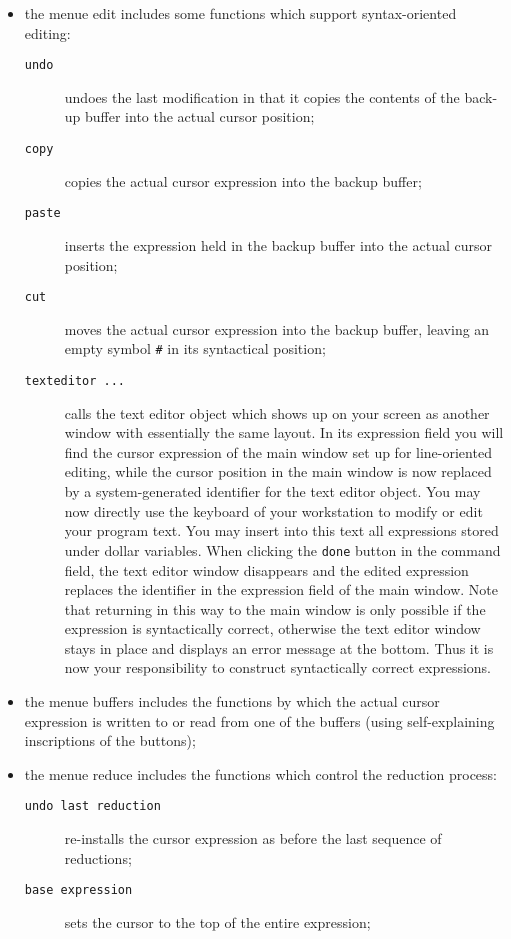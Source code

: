 \begin{itemize}
\item the menue {\sc edit} includes some functions which support syntax-oriented
editing:
\begin{description}
\item[{\tt undo}] undoes the last modification in that it copies the
contents of the back-up buffer into the actual cursor position;
\item[{\tt copy}] copies the actual cursor expression into the backup buffer;
\item[{\tt paste}] inserts the expression held in the backup buffer into the actual
cursor position;
\item[{\tt cut}] moves the actual cursor expression into the backup buffer,
leaving an empty symbol {\tt \#} in its syntactical position;
\item[{\tt texteditor ...}] calls the text editor object 
which shows up on your screen as another window with essentially
the same layout. In its expression field you will find the cursor
expression of the main window set up for line-oriented editing, while the cursor
position in the main window is now replaced by a system-generated identifier for
the text editor object. You may now directly use the keyboard of your workstation
to modify or edit your program text. You may insert into this text
all expressions stored under dollar variables. When clicking the
{\tt done} button in the command field, the text editor window disappears 
and the edited expression replaces the identifier in the expression field
of the main window. Note that returning in this way to the main window is only possible if
the expression is syntactically correct, otherwise the text editor window stays in place
and displays an error message at the bottom. Thus it is  now
your responsibility to construct syntactically correct expressions.   
\end{description}
\item the menue {\sc buffers} includes the functions by which the actual
cursor expression is written to or read from one of the buffers (using
self-explaining inscriptions of the buttons);
\item the menue {\sc reduce} includes the functions which control the reduction
process:
\begin{description}
\item[{\tt undo last reduction}] re-installs the cursor expression as before the last sequence of reductions;
\item[{\tt base expression}] sets the cursor to the top of the entire expression;

\end{description}
\end{itemize}
